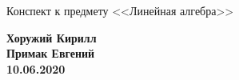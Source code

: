
\begin{center}
    \LARGE Конспект к предмету <<Линейная алгебра>>
\end{center}
\begin{flushright}
    \textbf{Хоружий Кирилл} \\
    \textbf{Примак Евгений} \\
    \textbf{10.06.2020}
\end{flushright}

